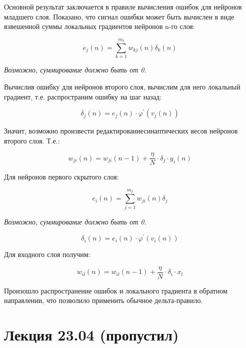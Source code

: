 \documentclass{article}
\numberwithin{equation}{subsection}
\begin{document}
Основной результат заключается в правиле вычисления ошибок для нейронов младшего слоя. 
Показано, что сигнал ошибки может быть вычислен в виде взвешенной суммы локальных градиентов
нейронов n-го слоя:

\begin{equation}
    e_j(n) = \sum_{k=1}^{m_3} w_{kj}(n) \delta_k (n)
\end{equation}

\begin{myquote}
    \textit{Возможно, суммирование должно быть от 0.}
\end{myquote}

Вычислив ошибку для нейронов второго слоя, вычислим для него локальный градиент, т.е. 
распространим ошибку на шаг назад:

\begin{equation}
    \delta_j(n) = e_j(n) \cdot \varphi^{\prime} (v_j(n))
\end{equation}

Значит, возможно произвести \glqq редактирование\grqq синаптических весов нейронов второго слоя. Т.е.:

\begin{equation}
    w_{ji}(n) = w_{ji}(n-1) + \dfrac{\eta}{N} \cdot \delta_j \cdot y_i(n)
\end{equation}

Для нейронов первого скрытого слоя:

\begin{equation}
    e_i(n) = \sum_{j=1}^{m_2} w_{ji}(n) \delta_j
\end{equation}

\begin{myquote}
    \textit{Возможно, суммирование должно быть от 0.}
\end{myquote}

\begin{equation}
    \delta_i(n) = e_i(n) \cdot \varphi^{\prime} (v_i(n))
\end{equation}

Для входного слоя получим:

\begin{equation}
    w_{il}(n) = w_{il}(n-1) + \dfrac{\eta}{N} \cdot \delta_i \cdot x_l
\end{equation}

Произошло распространение ошибок и локального градиента в обратном направлении, что
позволило применить обычное дельта-правило.



\section{Лекция 23.04 (пропустил)}
\end{document}
